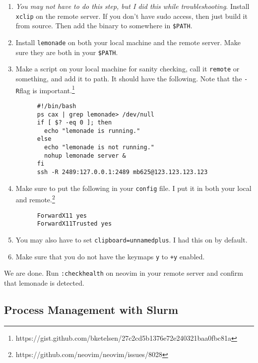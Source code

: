   \begin{enumerate}
    \item \textit{You may not have to do this step, but I did this while troubleshooting}. Install \texttt{xclip} on the remote server. If you don't have sudo access, then just build it from source. Then add the binary to somewhere in \texttt{\$PATH}. 

    \item Install \texttt{lemonade} on both your local machine and the remote server. Make sure they are both in your \texttt{\$PATH}. 

    \item Make a script on your local machine for sanity checking, call it \texttt{remote} or something, and add it to path. It should have the following. Note that the \texttt{-R}flag is important.\footnote{https://gist.github.com/bketelsen/27c2cd5b1376e72e240321baa0fbc81a} 

    \begin{lstlisting}
      #!/bin/bash
      ps cax | grep lemonade> /dev/null
      if [ $? -eq 0 ]; then
        echo "lemonade is running."
      else
        echo "lemonade is not running."
        nohup lemonade server &
      fi
      ssh -R 2489:127.0.0.1:2489 mb625@123.123.123.123
    \end{lstlisting}

    \item Make sure to put the following in your \texttt{config} file. I put it in both your local and remote.\footnote{https://github.com/neovim/neovim/issues/8028} 

    \begin{lstlisting}
      ForwardX11 yes
      ForwardX11Trusted yes
    \end{lstlisting}

    \item You may also have to set \texttt{clipboard=unnamedplus}. I had this on by default. 

    \item Make sure that you do not have the keymaps \texttt{y} to \texttt{+y} enabled. 
  \end{enumerate}

  We are done. Run \texttt{:checkhealth} on neovim in your remote server and confirm that lemonade is detected. 

\subsection{Process Management with Slurm}


